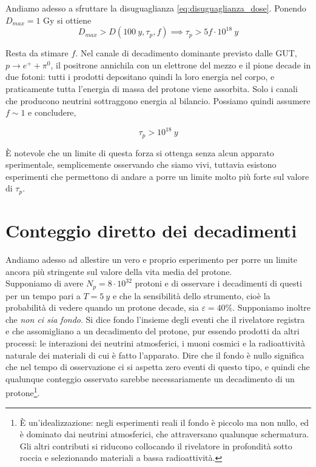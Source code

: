 Andiamo adesso a sfruttare la disuguaglianza \eqref{eq:disuguaglianza_dose}. Ponendo $D_{max} = 1$ Gy si ottiene
%
\begin{equation*}
    D_{max} > D(100 \ y, \tau_p, f) \implies \tau_p > 5f \cdot10^{18} \ y
\end{equation*}

Resta da stimare $f$. Nel canale di decadimento dominante previsto dalle GUT, $p \to e^+ + \pi^0$, il positrone annichila con un elettrone del mezzo e il pione decade in due fotoni: tutti i prodotti depositano quindi la loro energia nel corpo, e praticamente tutta l'energia di massa del protone viene assorbita. Solo i canali che producono neutrini sottraggono energia al bilancio. Possiamo quindi assumere $f \sim 1$ e concludere, 

\begin{tcolorbox}[colback=black!5!white, colframe=black!45!white, boxrule=0.8pt]
\begin{equation}
    \tau_p > 10^{18} \ y
\end{equation}
\end{tcolorbox}

È notevole che un limite di questa forza si ottenga senza alcun apparato sperimentale, semplicemente osservando che siamo vivi, tuttavia esistono esperimenti che permettono di andare a porre un limite molto più forte sul valore di $\tau_p$.

\section{Conteggio diretto dei decadimenti}

Andiamo adesso ad allestire un vero e proprio esperimento per porre un limite ancora più stringente sul valore della vita media del protone. \\

Supponiamo di avere $N_p = 8 \cdot 10^{32}$ protoni e di osservare i decadimenti di questi per un tempo pari a $T = 5 \ y$ e che la sensibilità dello strumento, cioè la probabilità di vedere quando un protone decade, sia $\varepsilon = 40 \%$. Supponiamo inoltre che \emph{non ci sia fondo}. Si dice fondo l'insieme degli eventi che il rivelatore registra e che assomigliano a un decadimento del protone, pur essendo prodotti da altri processi: le interazioni dei neutrini atmosferici, i muoni cosmici e la radioattività naturale dei materiali di cui è fatto l'apparato. Dire che il fondo è nullo significa che nel tempo di osservazione ci si aspetta zero eventi di questo tipo, e quindi che qualunque conteggio osservato sarebbe necessariamente un decadimento di un protone\footnote{È un'idealizzazione: negli esperimenti reali il fondo è piccolo ma non nullo, ed è dominato dai neutrini atmosferici, che attraversano qualunque schermatura. Gli altri contributi si riducono collocando il rivelatore in profondità sotto roccia e selezionando materiali a bassa radioattività.}.\\

